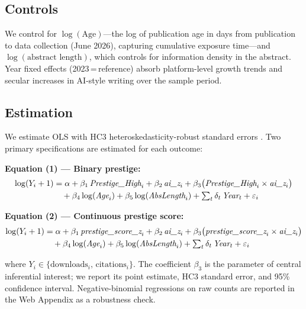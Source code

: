 \documentclass[12pt,a4paper]{article}
\begin{document}
\subsection{Controls}

We control for $\log(\text{Age})$---the log of publication age in
days from publication to data collection (June 2026), capturing
cumulative exposure time---and $\log(\text{abstract length})$,
which controls for information density in the abstract.
Year fixed effects (2023\,=\,reference) absorb platform-level growth
trends and secular increases in AI-style writing over the sample period.

\subsection{Estimation}

We estimate OLS with HC3 heteroskedasticity-robust standard errors
\citep{MacKinnon1985}.
Two primary specifications are estimated for each outcome:

\noindent\textbf{Equation (1) --- Binary prestige:}
\begin{align}
\log(Y_i+1) &= \alpha
  + \beta_1\,\textit{Prestige\_High}_i
  + \beta_2\,\textit{ai\_z}_i
  + \beta_3\bigl(\textit{Prestige\_High}_i\times\textit{ai\_z}_i\bigr)
  \notag\\
  &\quad
  + \beta_4\log(\textit{Age}_i)
  + \beta_5\log(\textit{AbsLength}_i)
  + \textstyle\sum_{t}\delta_t\,\textit{Year}_t
  + \varepsilon_i
\label{eq:binary}
\end{align}

\noindent\textbf{Equation (2) --- Continuous prestige score:}
\begin{align}
\log(Y_i+1) &= \alpha
  + \beta_1\,\textit{prestige\_score\_z}_i
  + \beta_2\,\textit{ai\_z}_i
  + \beta_3\bigl(\textit{prestige\_score\_z}_i\times\textit{ai\_z}_i\bigr)
  \notag\\
  &\quad
  + \beta_4\log(\textit{Age}_i)
  + \beta_5\log(\textit{AbsLength}_i)
  + \textstyle\sum_{t}\delta_t\,\textit{Year}_t
  + \varepsilon_i
\label{eq:score}
\end{align}

\noindent
where $Y_i\in\{\text{downloads}_i,\,\text{citations}_i\}$.
The coefficient $\beta_3$ is the parameter of central inferential
interest; we report its point estimate, HC3 standard error, and 95\%
confidence interval.
Negative-binomial regressions on raw counts are reported in the
Web Appendix as a robustness check.
\end{document}
